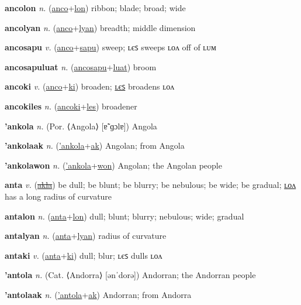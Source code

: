 \textbf{\hypertarget{ancolon}{ancolon}} \textit{n.} (\hyperlink{anco}{anco}+\allowbreak \hyperlink{lon}{lon})
ribbon; blade; broad; wide

\textbf{\hypertarget{ancolyan}{ancolyan}} \textit{n.} (\hyperlink{anco}{anco}+\allowbreak \hyperlink{lyan}{lyan})
breadth; middle dimension

\textbf{\hypertarget{ancosapu}{ancosapu}} \textit{v.} (\hyperlink{anco}{anco}+\allowbreak \hyperlink{sapu}{sapu})
sweep; ʟєꜱ sweeps ʟᴏᴧ off of ʟᴜᴍ

\textbf{\hypertarget{ancosapuluat}{ancosapuluat}} \textit{n.} (\hyperlink{ancosapu}{ancosapu}+\allowbreak \hyperlink{luat}{luat})
broom

\textbf{\hypertarget{ancoki}{ancoki}} \textit{v.} (\hyperlink{anco}{anco}+\allowbreak \hyperlink{ki}{ki})
broaden; \hyperlink{ancokiles}{ʟєꜱ} broadens ʟᴏᴧ

\textbf{\hypertarget{ancokiles}{ancokiles}} \textit{n.} (\hyperlink{ancoki}{ancoki}+\allowbreak \hyperlink{les}{les})
broadener

\textbf{\hypertarget{'ankola}{'ankola}} \textit{n.} (Por. ⟨Angola⟩ [ɐ̃ˈɡɔlɐ])
Angola

\textbf{\hypertarget{'ankolaak}{'ankolaak}} \textit{n.} (\hyperlink{'ankola}{'ankola}+\allowbreak \hyperlink{ak}{ak})
Angolan; from Angola

\textbf{\hypertarget{'ankolawon}{'ankolawon}} \textit{n.} (\hyperlink{'ankola}{'ankola}+\allowbreak \hyperlink{won}{won})
Angolan; the Angolan people

\textbf{\hypertarget{anta}{anta}} \textit{v.} (\hyperlink{akla}{\sout{akla}})
be dull; be blunt; be blurry; be nebulous; be wide; be gradual; \hyperlink{antalon}{ʟᴏᴧ} has a long radius of curvature

\textbf{\hypertarget{antalon}{antalon}} \textit{n.} (\hyperlink{anta}{anta}+\allowbreak \hyperlink{lon}{lon})
dull; blunt; blurry; nebulous; wide; gradual

\textbf{\hypertarget{antalyan}{antalyan}} \textit{n.} (\hyperlink{anta}{anta}+\allowbreak \hyperlink{lyan}{lyan})
radius of curvature

\textbf{\hypertarget{antaki}{antaki}} \textit{v.} (\hyperlink{anta}{anta}+\allowbreak \hyperlink{ki}{ki})
dull; blur; ʟєꜱ dulls ʟᴏᴧ

\textbf{\hypertarget{'antola}{'antola}} \textit{n.} (Cat. ⟨Andorra⟩ [ənˈdorə])
Andorran; the Andorran people

\textbf{\hypertarget{'antolaak}{'antolaak}} \textit{n.} (\hyperlink{'antola}{'antola}+\allowbreak \hyperlink{ak}{ak})
Andorran; from Andorra

